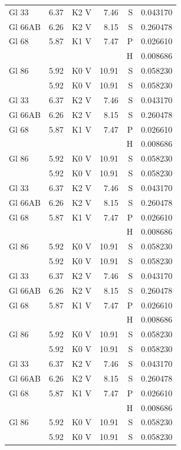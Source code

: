 \documentclass{aa}
\begin{document}
{\begin{longtable}{lllrrr}
Gl 33    & 6.37 & K2 V & 7.46 & S & 0.043170\\
Gl 66AB  & 6.26 & K2 V & 8.15 & S & 0.260478\\
Gl 68    & 5.87 & K1 V & 7.47 & P & 0.026610\\
         &      &      &      & H & 0.008686\\
Gl 86    & 5.92 & K0 V & 10.91& S & 0.058230\\            & 5.92 & K0 V & 10.91& S & 0.058230\\
Gl 33    & 6.37 & K2 V & 7.46 & S & 0.043170\\
Gl 66AB  & 6.26 & K2 V & 8.15 & S & 0.260478\\
Gl 68    & 5.87 & K1 V & 7.47 & P & 0.026610\\
         &      &      &      & H & 0.008686\\
Gl 86    & 5.92 & K0 V & 10.91& S & 0.058230\\
         & 5.92 & K0 V & 10.91& S & 0.058230\\
Gl 33    & 6.37 & K2 V & 7.46 & S & 0.043170\\
Gl 66AB  & 6.26 & K2 V & 8.15 & S & 0.260478\\
Gl 68    & 5.87 & K1 V & 7.47 & P & 0.026610\\
         &      &      &      & H & 0.008686\\
Gl 86    & 5.92 & K0 V & 10.91& S & 0.058230\\            & 5.92 & K0 V & 10.91& S & 0.058230\\
Gl 33    & 6.37 & K2 V & 7.46 & S & 0.043170\\
Gl 66AB  & 6.26 & K2 V & 8.15 & S & 0.260478\\
Gl 68    & 5.87 & K1 V & 7.47 & P & 0.026610\\
         &      &      &      & H & 0.008686\\
Gl 86    & 5.92 & K0 V & 10.91& S & 0.058230\\
         & 5.92 & K0 V & 10.91& S & 0.058230\\
Gl 33    & 6.37 & K2 V & 7.46 & S & 0.043170\\
Gl 66AB  & 6.26 & K2 V & 8.15 & S & 0.260478\\
Gl 68    & 5.87 & K1 V & 7.47 & P & 0.026610\\
         &      &      &      & H & 0.008686\\
Gl 86    & 5.92 & K0 V & 10.91& S & 0.058230\\            & 5.92 & K0 V & 10.91& S & 0.058230\\

\end{longtable}}
\end{document}

